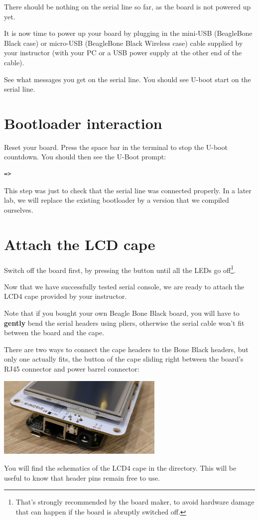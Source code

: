 There should be nothing on the serial line so far, as the board is not
powered up yet.

It is now time to power up your board by plugging in the mini-USB
(BeagleBone Black case) or micro-USB (BeagleBone Black Wireless case)
cable supplied by your instructor (with your PC or a USB power supply at the
other end of the cable).

See what messages you get on the serial line. You should see U-boot
start on the serial line.

\section{Bootloader interaction}

Reset your board. Press the space bar in the  terminal
to stop the U-boot countdown. You should then see the U-Boot prompt:

\begin{verbatim}
=>
\end{verbatim}

This step was just to check that the serial line was connected
properly. In a later lab, we will replace the existing bootloader by
a version that we compiled ourselves.

\section{Attach the LCD cape}

Switch off the board first, by pressing the  button until
all the LEDs go off\footnote{That's strongly recommended by the board
maker, to avoid hardware damage that can happen if the board is abruptly
switched off.}.

Now that we have successfully tested serial console, we are ready to
attach the LCD4 cape provided by your instructor.

Note that if you bought your own Beagle Bone Black board, you will have
to {\bf gently} bend the serial headers using pliers, otherwise the
serial cable won't fit between the board and the cape.

There are two ways to connect the cape headers to the Bone Black
headers, but only one actually fits, the  button of the cape
sliding right between the board's RJ45 connector and power barrel
connector:
\begin{center}
\includegraphics[width=8cm]{labs/boot-time-board-setup/connecting-lcd4-cape.jpg}
\end{center}

You will find the schematics of the LCD4 cape in the
 directory. This will be useful to know
that header pins remain free to use.
